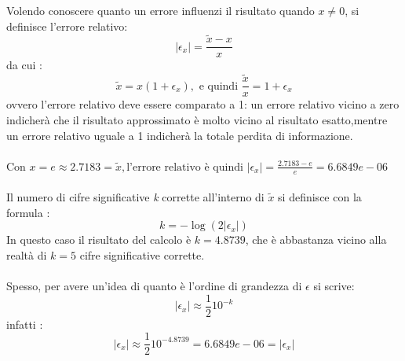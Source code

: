 Volendo conoscere quanto un errore influenzi il risultato quando $x\neq0$, si definisce l’errore relativo:
\[
|\epsilon_x| = \frac{\tilde{x}-x}{x} 
\]
da cui :
\[
\tilde{x} = x(1+\epsilon_x), \text{ e quindi } \frac{\tilde{x}}{x} = 1 + \epsilon_x
\]
ovvero l’errore relativo deve essere comparato a 1: un errore relativo vicino a zero indicherà che il risultato approssimato è molto vicino al risultato esatto,mentre un errore relativo uguale a 1 indicherà la totale perdita di informazione.\\\\
Con $x = e \approx 2.7183 = \tilde{x}, \text{l'errore relativo è quindi } |\epsilon_x| = \frac{2.7183 - e}{e} = 6.6849e-06$\\\\
Il numero di cifre significative \textit{k} corrette all’interno di $\tilde{x}$ si definisce con la formula :
\[
\textit{k} = -\log(2|\epsilon_x|)
\]
In questo caso il risultato del calcolo è $\textit{k}=4.8739$, che è abbastanza vicino alla realtà di $\textit{k}=5$ cifre significative corrette.\\\\
Spesso, per avere un’idea di quanto è l’ordine di grandezza di $\epsilon$ si scrive:
\[
|\epsilon_x| \approx \frac{1}{2}10^{-\textit{k}}
\]
infatti : 
\[
|\epsilon_x| \approx \frac{1}{2}10^{-4.8739} = 6.6849e-06 = |\epsilon_x|
\]